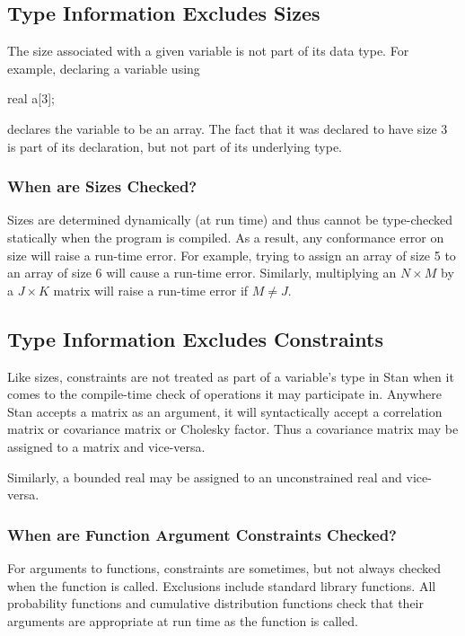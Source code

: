 \subsection{Type Information Excludes Sizes}

The size associated with a given variable is not part of its data
type.  For example, declaring a variable using
\begin{stancode}
real a[3];
\end{stancode}
%
declares the variable  to be an array.  The fact that it was
declared to have size 3 is part of its declaration, but not part of
its underlying type.

\subsubsection{When are Sizes Checked?}

Sizes are determined dynamically (at run time) and thus cannot be
type-checked statically when the program is compiled.  As a result,
any conformance error on size will raise a run-time error.  For
example, trying to assign an array of size 5 to an array of size 6
will cause a run-time error.  Similarly, multiplying an $N
\times M$ by a $J \times K$ matrix will raise a run-time error if $M
\neq J$.

\subsection{Type Information Excludes Constraints}

Like sizes, constraints are not treated as part of a variable's type
in Stan when it comes to the compile-time check of operations it may
participate in.  Anywhere Stan accepts a matrix as an argument, it
will syntactically accept a correlation matrix or covariance matrix or
Cholesky factor.  Thus a covariance matrix may be assigned to a matrix
and vice-versa.

Similarly, a bounded real may be assigned to an unconstrained real and
vice-versa.

\subsubsection{When are Function Argument Constraints Checked?}

For arguments to functions, constraints are sometimes, but not always
checked when the function is called.  Exclusions include \Cpp standard
library functions.  All probability functions and cumulative
distribution functions check that their arguments are appropriate at
run time as the function is called.

